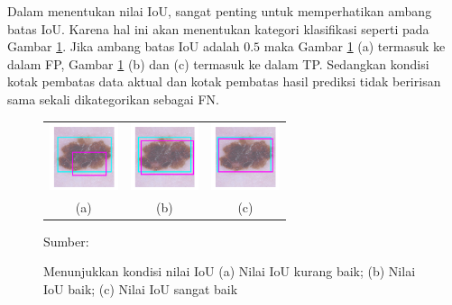 Dalam menentukan nilai IoU, sangat penting untuk memperhatikan ambang batas IoU. Karena hal ini akan menentukan kategori klasifikasi seperti pada Gambar \ref{fig:iou-cat}. Jika ambang batas IoU adalah $0.5$ maka Gambar \ref{fig:iou-cat} (a) termasuk ke dalam FP, Gambar \ref{fig:iou-cat} (b) dan (c) termasuk ke dalam TP. Sedangkan kondisi kotak pembatas data aktual dan kotak pembatas hasil prediksi tidak beririsan sama sekali dikategorikan sebagai FN.

\begin{figure}[H]
    \centering
    \begin{tabular}{ccc}
        \includegraphics[width=2cm]{img/bab2/iou-poor.png}
        &
        \includegraphics[width=2cm]{img/bab2/iou-good.png}
        &
        \includegraphics[width=2cm]{img/bab2/iou-excelent.png}\\
        (a) &(b) &(c)\\
    \end{tabular}
    \caption{Menunjukkan kondisi nilai IoU (a) Nilai IoU kurang baik; (b) Nilai IoU baik; (c) Nilai IoU sangat baik}
    \label{fig:iou-cat}
    Sumber: \citep{Cowton2019}
\end{figure}

